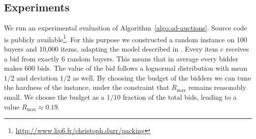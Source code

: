 %
%    
%

\subsection{Experiments}

We run an experimental evaluation of Algorithm~\ref{algo:ad-auctions}. Source code is publicly available\footnote{\url{http://www.lip6.fr/christoph.durr/packing}}.
For this purpose we constructed a random instance on 100 buyers and 10,000 items, adapting the model described in \cite{Lavastida20:Predictions-Matching}. Every item $e$ receives a bid from exactly 6 random buyers. This means that in average every bidder makes 600 bids. The value of the bid follows a lognormal distribution with mean $1/2$ and deviation $1/2$ as well. By choosing the budget of the bidders we can tune the hardness of the instance, under the constraint that $R_{\max}$ remains reasonably small. We choose the budget as a $1/10$ fraction of the total bids, leading to a value $R_{\max}\approx 0.19$.

